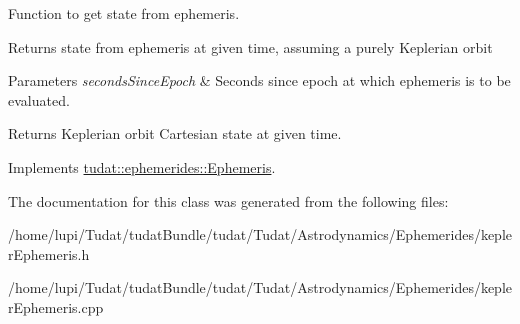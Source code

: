Function to get state from ephemeris. 

Returns state from ephemeris at given time, assuming a purely Keplerian orbit 
\begin{DoxyParams}{Parameters}
{\em seconds\+Since\+Epoch} & Seconds since epoch at which ephemeris is to be evaluated. \\
\hline
\end{DoxyParams}
\begin{DoxyReturn}{Returns}
Keplerian orbit Cartesian state at given time. 
\end{DoxyReturn}


Implements \hyperlink{classtudat_1_1ephemerides_1_1Ephemeris_a9ffa2e6b00aa190385d87266bc6ca091}{tudat\+::ephemerides\+::\+Ephemeris}.



The documentation for this class was generated from the following files\+:\begin{DoxyCompactItemize}
\item 
/home/lupi/\+Tudat/tudat\+Bundle/tudat/\+Tudat/\+Astrodynamics/\+Ephemerides/kepler\+Ephemeris.\+h\item 
/home/lupi/\+Tudat/tudat\+Bundle/tudat/\+Tudat/\+Astrodynamics/\+Ephemerides/kepler\+Ephemeris.\+cpp\end{DoxyCompactItemize}
